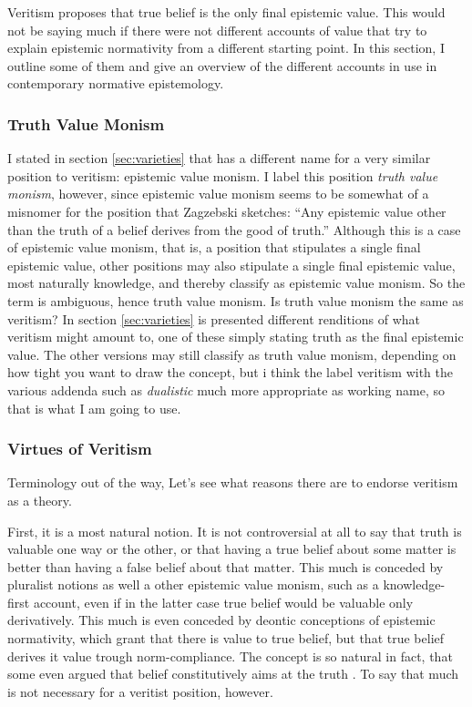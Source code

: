 \documentclass[12pt,numbers=noenddot]{scrartcl}
\begin{document}
Veritism proposes that true belief is the only final epistemic value. This would not be saying much if there were not different accounts of value that try to explain epistemic normativity from a different starting point. In this section, I outline some of them and give an overview of the different accounts in use in contemporary normative epistemology.

\subsubsection{ Truth Value Monism }
I stated in section \ref{sec:varieties} that \textcite[191]{Zagzebski2004-ZAGEVM-2} has a different name for a very similar position to veritism: epistemic value monism. I label this position \emph{truth value monism}, however, since epistemic value monism seems to be somewhat of a misnomer for the position that Zagzebski sketches: “Any epistemic value other than the truth of a belief derives from the good of truth.” Although this is a case of epistemic value monism, that is, a position that stipulates a single final epistemic value, other positions may also stipulate a single final epistemic value, most naturally knowledge, and thereby classify as epistemic value monism. So the term is ambiguous, hence truth value monism.
Is truth value monism the same as veritism? In section \ref{sec:varieties} is presented different renditions of what veritism might amount to, one of these simply stating truth as the final epistemic value. The other versions may still classify as truth value monism, depending on how tight you want to draw the concept, but i think the label veritism with the various addenda such as \emph{dualistic} much more appropriate as working name, so that is what I am going to use.

\subsubsection { Virtues of Veritism }
Terminology out of the way, Let's see what reasons there are to endorse veritism as a theory.

First, it is a most natural notion. It is not controversial at all to say that truth is valuable one way or the other, or that having a true belief about some matter is better than having a false belief about that matter. This much is conceded by pluralist notions as well a other epistemic value monism, such as a knowledge-first account, even if in the latter case true belief would be valuable only derivatively. This much is even conceded by deontic conceptions of epistemic normativity, which grant that there is value to true belief, but that true belief derives it value trough norm-compliance. The concept is so natural in fact, that some even argued that belief constitutively aims at the truth \autocite{Shah2003-SHAHTG,Velleman2000-VELOTA}. To say that much is not necessary for a veritist position, however.
\end{document}
